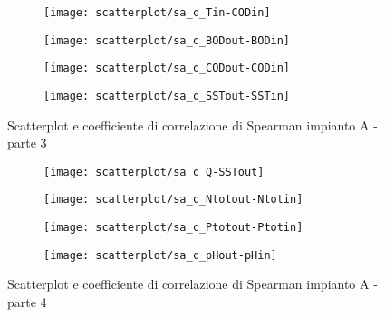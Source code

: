 \begin{sidewaysfigure}[h]\ContinuedFloat
	\renewcommand*\thesubfigure{(\arabic{subfigure})}
	\begin{subfigure}{0.49\textwidth}
		\texttt{[image: scatterplot/sa\_c\_Tin-CODin]}
		\caption{}
		\centering
	\end{subfigure}
	\begin{subfigure}{0.49\textwidth}
		\texttt{[image: scatterplot/sa\_c\_BODout-BODin]}
		\caption{}
		\centering
	\end{subfigure}

	\begin{subfigure}{0.49\textwidth}
		\texttt{[image: scatterplot/sa\_c\_CODout-CODin]}
		\caption{}
		\centering
	\end{subfigure}
	\begin{subfigure}{0.49\textwidth}
		\texttt{[image: scatterplot/sa\_c\_SSTout-SSTin]}	
		\caption{}
		\centering
	\end{subfigure}
	\caption{Scatterplot e coefficiente di correlazione di Spearman impianto A - parte 3}
\end{sidewaysfigure}

\begin{sidewaysfigure}[h]\ContinuedFloat
	\renewcommand*\thesubfigure{(\arabic{subfigure})}
	\begin{subfigure}{0.49\textwidth}
		\texttt{[image: scatterplot/sa\_c\_Q-SSTout]}
		\caption{}
		\centering
	\end{subfigure}
	\begin{subfigure}{0.49\textwidth}
		\texttt{[image: scatterplot/sa\_c\_Ntotout-Ntotin]}
		\caption{}
		\centering
	\end{subfigure}

	\begin{subfigure}{0.49\textwidth}
		\texttt{[image: scatterplot/sa\_c\_Ptotout-Ptotin]}
		\caption{}
		\centering
	\end{subfigure}
	\begin{subfigure}{0.49\textwidth}
		\texttt{[image: scatterplot/sa\_c\_pHout-pHin]}	
		\caption{}
		\centering
	\end{subfigure}
	\caption{Scatterplot e coefficiente di correlazione di Spearman impianto A - parte 4}
\end{sidewaysfigure}


